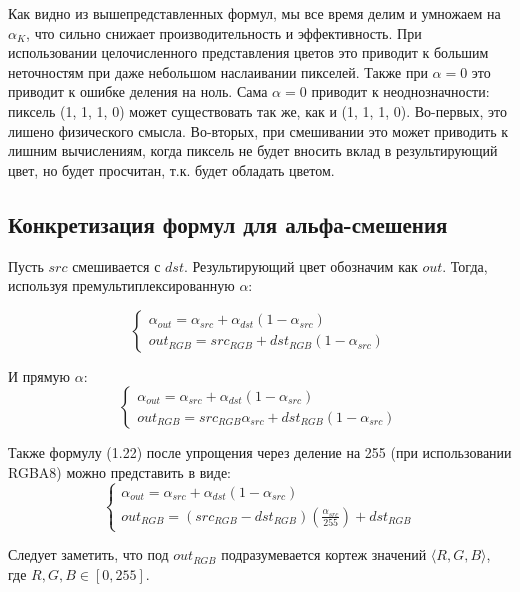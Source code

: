 Как видно из вышепредставленных формул, мы все время делим и умножаем на $\alpha_{K}$, что сильно снижает производительность и эффективность. При использовании целочисленного представления цветов это приводит к большим неточностям при даже небольшом наслаивании пикселей. Также при $\alpha = 0$ это приводит к ошибке деления на ноль. Сама $\alpha = 0$ приводит к неоднозначности: пиксель (1, 1, 1, 0) может существовать так же, как и (1, 1, 1, 0). Во-первых, это лишено физического смысла. Во-вторых, при смешивании это может приводить к лишним вычислениям, когда пиксель не будет вносить вклад в результирующий цвет, но будет просчитан, т.к. будет обладать цветом. 

\subsection{Конкретизация формул для альфа-смешения}
Пусть $src$ смешивается с $dst$. Результирующий цвет обозначим как $out$.
Тогда, используя премультиплексированную $\alpha$: 

\begin{equation}
\begin{cases} \alpha_{out}= \alpha_{src} + \alpha_{dst}(1- \alpha_{src}) \\
out_{RGB} = src_{RGB} + dst_{RGB}(1-\alpha_{src})
\end{cases}
\end{equation}

И прямую $\alpha$:
\begin{equation}
\begin{cases} 
\alpha_{out}= \alpha_{src} + \alpha_{dst}(1- \alpha_{src}) \\
out_{RGB} = src_{RGB}\alpha_{src} + dst_{RGB}(1 - \alpha_{src})
\end{cases}
\end{equation}

Также формулу (1.22) после упрощения через деление на 255 (при использовании RGBA8)  можно представить в виде:
\begin{equation}
\begin{cases} 
\alpha_{out}= \alpha_{src} + \alpha_{dst}(1- \alpha_{src}) \\
out_{RGB} = (src_{RGB} - dst_{RGB}) (\frac{\alpha_{src}}{255} ) + dst_{RGB}
\end{cases}
\end{equation}
 

Следует заметить, что под $out_{RGB}$  подразумевается кортеж значений $\langle R, G, B\rangle$, где $R, G, B \in [0, 255]$.

